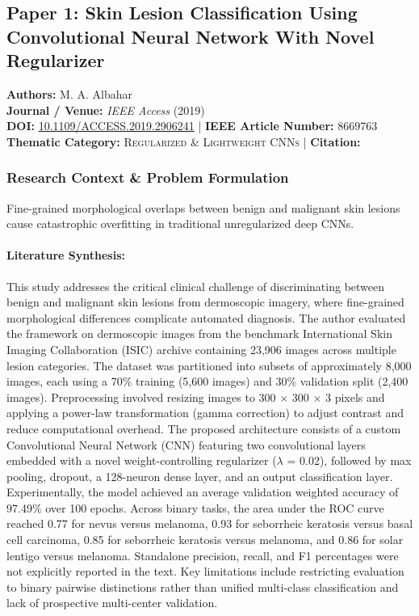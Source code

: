 \subsection{Paper 1: Skin Lesion Classification Using Convolutional Neural Network With Novel Regularizer}
\label{sec:paper_1}

\begin{tcolorbox}[colback=gray!5!white,colframe=gray!75!black,title=\textbf{Metadata \& Citation Summary}]
\textbf{Authors:} M. A. Albahar \\
\textbf{Journal / Venue:} \textit{IEEE Access} (2019) \\
\textbf{DOI:} \href{https://doi.org/10.1109/ACCESS.2019.2906241}{10.1109/ACCESS.2019.2906241} \quad | \quad \textbf{IEEE Article Number:} 8669763 \\
\textbf{Thematic Category:} \textsc{Regularized \& Lightweight CNNs} \quad | \quad \textbf{Citation:} \cite{8669763}
\end{tcolorbox}

\subsubsection*{Research Context \& Problem Formulation}
Fine-grained morphological overlaps between benign and malignant skin lesions cause catastrophic overfitting in traditional unregularized deep CNNs.

\paragraph{Literature Synthesis:} This study addresses the critical clinical challenge of discriminating between benign and malignant skin lesions from dermoscopic imagery, where fine-grained morphological differences complicate automated diagnosis. The author evaluated the framework on dermoscopic images from the benchmark International Skin Imaging Collaboration (ISIC) archive containing 23,906 images across multiple lesion categories. The dataset was partitioned into subsets of approximately 8,000 images, each using a 70\% training (5,600 images) and 30\% validation split (2,400 images). Preprocessing involved resizing images to 300 $\times$ 300 $\times$ 3 pixels and applying a power-law transformation (gamma correction) to adjust contrast and reduce computational overhead. The proposed architecture consists of a custom Convolutional Neural Network (CNN) featuring two convolutional layers embedded with a novel weight-controlling regularizer ($\lambda$ = 0.02), followed by max pooling, dropout, a 128-neuron dense layer, and an output classification layer. Experimentally, the model achieved an average validation weighted accuracy of 97.49\% over 100 epochs. Across binary tasks, the area under the ROC curve reached 0.77 for nevus versus melanoma, 0.93 for seborrheic keratosis versus basal cell carcinoma, 0.85 for seborrheic keratosis versus melanoma, and 0.86 for solar lentigo versus melanoma. Standalone precision, recall, and F1 percentages were not explicitly reported in the text. Key limitations include restricting evaluation to binary pairwise distinctions rather than unified multi-class classification and lack of prospective multi-center validation.

